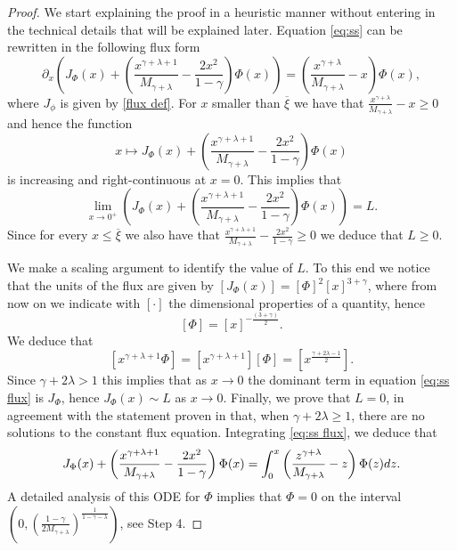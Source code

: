 \documentclass[11pt]{article}
\numberwithin{equation}{section}
\theoremstyle{plain}
\newcommand{\der}{\textup{d}}
\begin{document}
\begin{proof}
We start explaining the proof in a heuristic manner without entering in the technical details that will be explained later. 
Equation \eqref{eq:ss} can be rewritten in the following flux form
\begin{equation} \label{eq:ss flux}
 \partial_x \left( J_\Phi (x) + \left( \frac{x^{\gamma+\lambda +1 } }{ M_{\gamma + \lambda } } - \frac{2 x^2 }{1- \gamma }\right) \Phi(x ) \right)  =\left(  \frac{x^{\gamma+\lambda}}{M_{\gamma+\lambda}}  -x \right) \Phi(x ), 
\end{equation} 
where $J_\phi$ is given by \eqref{flux def}.
For $x$ smaller than $\overline \xi $ we have that $ \frac{x^{\gamma+\lambda}}{M_{\gamma+\lambda}}  -x  \geq 0$
and hence the function 
\[
x \mapsto J_\Phi (x) + \left( \frac{x^{\gamma+\lambda +1 } }{ M_{\gamma + \lambda } } - \frac{2 x^2 }{1- \gamma }\right) \Phi(x ) 
\] 
is increasing and right-continuous at $x=0$.
This implies that 
\[
\lim_{ x \rightarrow 0^+ } \left( J_\Phi (x) + \left( \frac{x^{\gamma+\lambda +1 } }{ M_{\gamma + \lambda } } - \frac{2 x^2 }{1- \gamma }\right) \Phi(x ) \right) =L.
\] 
Since for every
$x \leq \overline \xi $ 
we also have that 
$ \frac{x^{\gamma+\lambda +1 } }{ M_{\gamma + \lambda } } - \frac{2 x^2 }{1- \gamma } \geq 0
$ 
we deduce that $L \geq 0.$

We make a scaling argument to identify the value of $L. $
To this end we notice that the units of the flux are given by $[J_\Phi(x)] =[\Phi]^2 [x]^{3+\gamma }$, where from now on we indicate with $[\cdot]$ the dimensional properties of a quantity, hence
\[
[\Phi ] =\left[x\right]^{-\frac{(3+ \gamma) }{2}}.
\] 
We deduce that 
\[
[x^{\gamma + \lambda +1} \Phi  ] = [x^{\gamma + \lambda +1} ]  [\Phi] =[x^{\frac{\gamma + 2 \lambda -1}{2}}  ].
\] 
Since $\gamma + 2 \lambda > 1 $ this implies that as $x \rightarrow 0 $ the dominant term in equation \eqref{eq:ss flux} is $J_\Phi$, hence 
$J_\Phi(x)\sim L$ as $x \rightarrow 0$. Finally, we prove that $L=0$, in agreement with the statement proven in \cite{ferreira2019stationary} that, when $\gamma + 2 \lambda \geq 1 $, there are no solutions to the constant flux equation. 
Integrating \eqref{eq:ss flux}, we deduce that
\[
 J_\Phi (x) + \left( \frac{x^{\gamma+\lambda +1 } }{ M_{\gamma + \lambda } } - \frac{2 x^2 }{1- \gamma }\right) \Phi(x )  = \int_0^x \left(  \frac{z^{\gamma+\lambda}}{M_{\gamma+\lambda}}  -z \right) \Phi(z) \der z .
\] 
A detailed analysis of this ODE for $\Phi$ implies that 
$\Phi=0$ on the interval $\left(0, \left( \frac{1-\gamma }{2 M_{\gamma +\lambda} } \right)^{\frac{1}{1-\gamma-\lambda } } \right) $, see Step 4. 


\end{proof}
\end{document}
